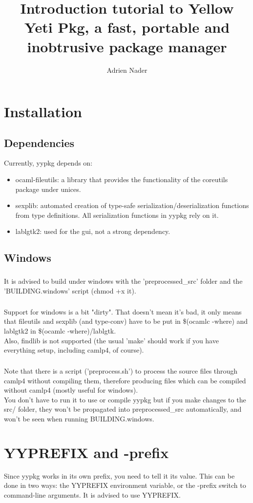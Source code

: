 \documentclass[a4paper]{article}
\author{Adrien Nader}
\title{Introduction tutorial to Yellow Yeti Pkg, a fast, portable and inobtrusive package manager}
\begin{document}
\maketitle

\tableofcontents
\section{Installation}
\subsection{Dependencies}
Currently, yypkg depends on:
\begin{itemize}
  \setlength{\parskip}{0em}
  \item{ocaml-fileutils}: a library that provides the functionality of the coreutils package under unices.
  \item{sexplib}: automated creation of type-safe serialization/deserialization functions from type definitions. All serialization functions in yypkg rely on it.
  \item{lablgtk2}: used for the gui, not a strong dependency.
\end{itemize}

\subsection{Windows}
\subparagraph{} It is advised to build under windows with the 'preprocessed\_src' folder and the 'BUILDING.windows' script (chmod +x it).

\subparagraph{} Support for windows is a bit "dirty". That doesn't mean it's bad, it only means that fileutils and sexplib (and type-conv) have to be put in \$(ocamlc -where) and lablgtk2 in \$(ocamlc -where)/lablgtk.\\
Also, findlib is not supported (the usual 'make' should work if you have everything setup, including camlp4, of course).

\subparagraph{} Note that there is a script ('preprocess.sh') to process the source files through camlp4 without compiling them, therefore producing files which can be compiled without camlp4 (mostly useful for windows).\\
You don't have to run it to use or compile yypkg but if you make changes to the src/ folder, they won't be propagated into preprocessed\_src automatically, and won't be seen when running BUILDING.windows.

\section{YYPREFIX and -prefix}
Since yypkg works in its own prefix, you need to tell it its value. This can be done in two ways: the YYPREFIX environment variable, or the -prefix switch to command-line arguments. It is advised to use YYPREFIX.
\end{document}
